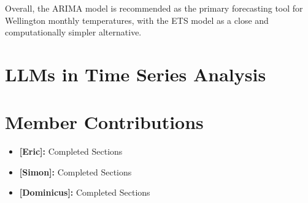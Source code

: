 \documentclass[11pt, a4paper]{article}\usepackage[]{graphicx}\usepackage[]{xcolor}
\begin{document}
Overall, the ARIMA model is recommended as the primary forecasting 
tool for Wellington monthly temperatures, with the ETS model as a 
close and computationally simpler alternative.

\section{LLMs in Time Series Analysis}



\section{Member Contributions}

\begin{itemize}
    \item \textbf{[Eric]:} Completed Sections 
    \item \textbf{[Simon]:} Completed Sections
    \item \textbf{[Dominicus]:} Completed Sections
\end{itemize}
\end{document}
